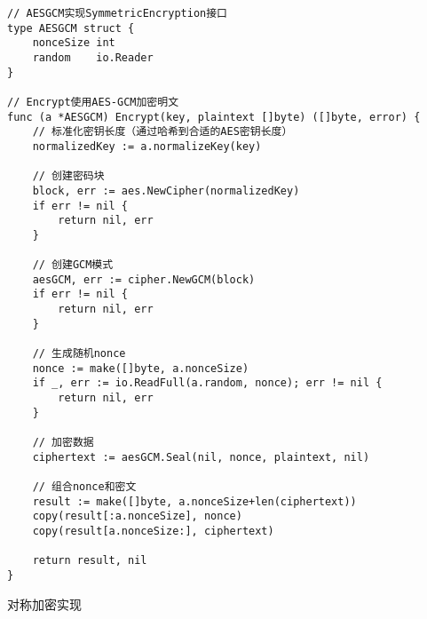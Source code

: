 \begin{listing}[ht]
\begin{verbatim}
// AESGCM实现SymmetricEncryption接口
type AESGCM struct {
    nonceSize int
    random    io.Reader
}

// Encrypt使用AES-GCM加密明文
func (a *AESGCM) Encrypt(key, plaintext []byte) ([]byte, error) {
    // 标准化密钥长度（通过哈希到合适的AES密钥长度）
    normalizedKey := a.normalizeKey(key)

    // 创建密码块
    block, err := aes.NewCipher(normalizedKey)
    if err != nil {
        return nil, err
    }

    // 创建GCM模式
    aesGCM, err := cipher.NewGCM(block)
    if err != nil {
        return nil, err
    }

    // 生成随机nonce
    nonce := make([]byte, a.nonceSize)
    if _, err := io.ReadFull(a.random, nonce); err != nil {
        return nil, err
    }

    // 加密数据
    ciphertext := aesGCM.Seal(nil, nonce, plaintext, nil)

    // 组合nonce和密文
    result := make([]byte, a.nonceSize+len(ciphertext))
    copy(result[:a.nonceSize], nonce)
    copy(result[a.nonceSize:], ciphertext)

    return result, nil
}
\end{verbatim}
\caption{对称加密实现}
\label{code:symmetric-encryption}
\end{listing}

